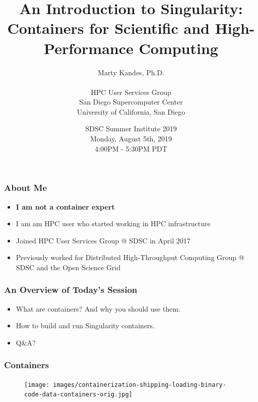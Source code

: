 \documentclass{beamer}
\title{An Introduction to Singularity: \\
       \small Containers for Scientific and High-Performance Computing}
\author{Marty Kandes, Ph.D. \\ \ \\
   \small HPC User Services Group \\
          San Diego Supercomputer Center \\
          University of California, San Diego}
\date{\small SDSC Summer Institute 2019 \\
             Monday, August 5th, 2019 \\
             4:00PM - 5:30PM PDT}
\begin{document}
\maketitle

\begin{frame}
   \frametitle{About Me}
   \begin{itemize}
      \setlength\itemsep{1.0em}
      \item \textbf{I am not a container expert}
      \item I am am HPC user who started working in HPC infrastructure
      \item Joined HPC User Services Group @ SDSC in April 2017
      \item Previously worked for Distributed High-Throughput Computing
         Group @ SDSC and the Open Science Grid
   \end{itemize}
\end{frame}

\begin{frame}
   \frametitle{An Overview of Today's Session}
   \begin{itemize}
      \setlength\itemsep{1.0em}
      \item What are containers? And why you should use them.
      \item How to build and run Singularity containers.
      \item Q\&A?
   \end{itemize}
\end{frame}

\begin{frame}
   \frametitle{Containers}
   \vspace{-1.0em}
   \begin{figure}[htbp]
      \texttt{[image: images/containerization-shipping-loading-binary-code-data-containers-orig.jpg]}
   \end{figure} 
\end{frame}
\end{document}
